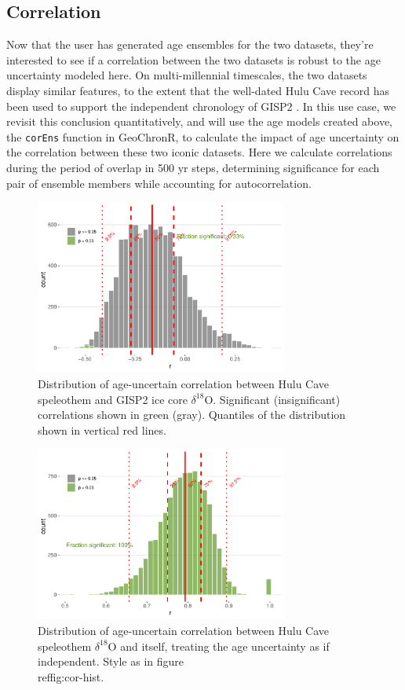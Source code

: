 \documentclass[gchron, manuscript]{copernicus}
\begin{document}
\subsection{Correlation}

Now that the user has generated age ensembles for the two datasets, they're interested to see if a correlation between the two datasets is robust to the age uncertainty modeled here.
On multi-millennial timescales, the two datasets display similar features, to the extent that the well-dated Hulu Cave record has been used to support the independent chronology of GISP2 \citep{hulu2001}.
In this use case, we revisit this conclusion quantitatively, and will use the age models created above, the \texttt{corEns} function in GeoChronR, to calculate the impact of age uncertainty on the correlation between these two iconic datasets.
Here we calculate correlations during the period of overlap in 500 yr steps, determining significance for each pair of ensemble members while accounting for autocorrelation.

\begin{figure}
\includegraphics[width=8.3cm]{geoChronR-paper_files/figure-latex/cor-hist-1} \caption{Distribution of age-uncertain correlation between Hulu Cave speleothem and GISP2 ice core $\delta^{18}$O. Significant (insignificant) correlations shown in green (gray).  Quantiles of the distribution shown in vertical red lines.}\label{fig:cor-hist}
\end{figure}

\begin{figure}
\includegraphics[width=8.3cm]{geoChronR-paper_files/figure-latex/hulu-cor-hist-1} \caption{Distribution of age-uncertain correlation between Hulu Cave speleothem $\delta^{18}$O and itself, treating the age uncertainty as if independent. Style as in figure \\ref{fig:cor-hist}.}\label{fig:hulu-cor-hist}
\end{figure}
\end{document}
